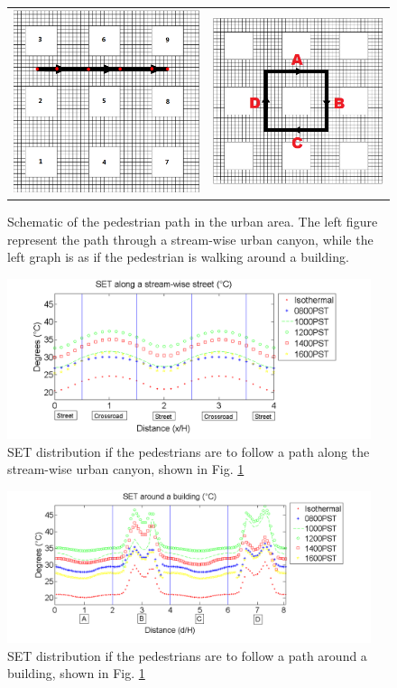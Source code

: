 \documentclass[smallextended]{svjour3}
\begin{document}
\begin{figure}[!h] \centering  
\graphicspath{ {image/} }
\begin{tabular}{cc}
 \includegraphics[width=.35\textwidth]{LineLocation.png}    &
 \includegraphics[width=.35\textwidth]{CircleLocation.png}   
\end{tabular}
\caption{Schematic of the pedestrian path in the urban area. The left figure represent the path through a stream-wise urban canyon, while the left graph is as if the pedestrian is walking around a building.} 
\label{Fig.Paths}
\end{figure}
   \begin{figure}[!h]
\graphicspath{ {image/} }
\centerline{\includegraphics[width=0.95\textwidth]{line.png}}
\caption{SET distribution if the pedestrians are to follow a path along the stream-wise urban canyon, shown in Fig.  \ref{Fig.Paths}}
\label{Fig.LineSum}
\end{figure}
\begin{figure}[!h]
\graphicspath{ {image/} }
\centerline{\includegraphics[width=0.95\textwidth]{loop.png}}
\caption{SET distribution if the pedestrians are to follow a path around a building, shown in Fig.  \ref{Fig.Paths}}
\label{Fig.LoopSum}
\end{figure}
\end{document}
